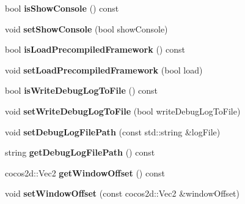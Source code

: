 \begin{DoxyCompactItemize}
\item 
\mbox{\label{classProjectConfig_ad75bea6af1c1314db4c2d536c1f7079a}} 
bool {\bfseries is\+Show\+Console} () const
\item 
\mbox{\label{classProjectConfig_a6350edad040596c3241b46108c18f8c2}} 
void {\bfseries set\+Show\+Console} (bool show\+Console)
\item 
\mbox{\label{classProjectConfig_aa5f71bdcd23d53cfcedb9fbf4a29c9e7}} 
bool {\bfseries is\+Load\+Precompiled\+Framework} () const
\item 
\mbox{\label{classProjectConfig_ab37e2bcc6ef5f4a65b25ca569451aace}} 
void {\bfseries set\+Load\+Precompiled\+Framework} (bool load)
\item 
\mbox{\label{classProjectConfig_ad4bae4d4bcba757d163e901759257004}} 
bool {\bfseries is\+Write\+Debug\+Log\+To\+File} () const
\item 
\mbox{\label{classProjectConfig_a20ba6f9e1e03dcb94d79c7f9f2632e13}} 
void {\bfseries set\+Write\+Debug\+Log\+To\+File} (bool write\+Debug\+Log\+To\+File)
\item 
\mbox{\label{classProjectConfig_a55043d51d69792dd7eef516587b48a49}} 
void {\bfseries set\+Debug\+Log\+File\+Path} (const std\+::string \&log\+File)
\item 
\mbox{\label{classProjectConfig_ac03f6d58914e3053d9faebfc8f186d7e}} 
string {\bfseries get\+Debug\+Log\+File\+Path} () const
\item 
\mbox{\label{classProjectConfig_ac03bcb40b650a827bb36147108c14419}} 
cocos2d\+::\+Vec2 {\bfseries get\+Window\+Offset} () const
\item 
\mbox{\label{classProjectConfig_af988294505d0e6083cec014bec4281ab}} 
void {\bfseries set\+Window\+Offset} (const cocos2d\+::\+Vec2 \&window\+Offset)
\item 
\mbox{\label{classProjectConfig_aadf71fe84b8debee6de4115c489baf3e}} 

\end{DoxyCompactItemize}
